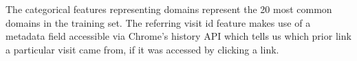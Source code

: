 \documentclass{sigchi}
\begin{document}

The categorical features representing domains represent the 20 most common domains in the training set. The referring visit id feature makes use of a metadata field accessible via Chrome's history API which tells us which prior link a particular visit came from, if it was accessed by clicking a link.

\end{document}
